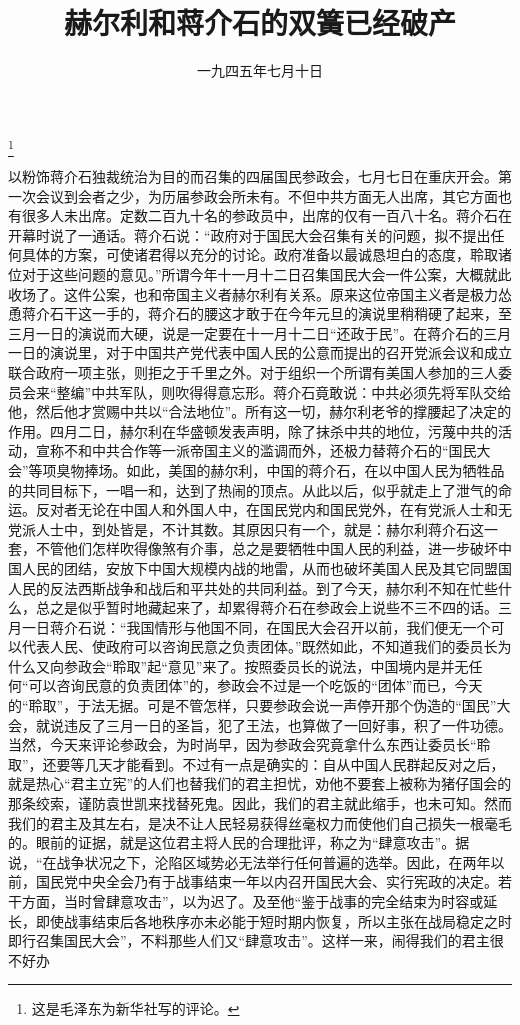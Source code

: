 
\title{赫尔利和蒋介石的双簧已经破产}
\date{一九四五年七月十日}
\thanks{这是毛泽东为新华社写的评论。}
\maketitle


以粉饰蒋介石独裁统治为目的而召集的四届国民参政会，七月七日在重庆开会。第一次会议到会者之少，为历届参政会所未有。不但中共方面无人出席，其它方面也有很多人未出席。定数二百九十名的参政员中，出席的仅有一百八十名。蒋介石在开幕时说了一通话。蒋介石说：“政府对于国民大会召集有关的问题，拟不提出任何具体的方案，可使诸君得以充分的讨论。政府准备以最诚恳坦白的态度，聆取诸位对于这些问题的意见。”所谓今年十一月十二日召集国民大会一件公案，大概就此收场了。这件公案，也和帝国主义者赫尔利有关系。原来这位帝国主义者是极力怂恿蒋介石干这一手的，蒋介石的腰这才敢于在今年元旦的演说里稍稍硬了起来，至三月一日的演说而大硬，说是一定要在十一月十二日“还政于民”。在蒋介石的三月一日的演说里，对于中国共产党代表中国人民的公意而提出的召开党派会议和成立联合政府一项主张，则拒之于千里之外。对于组织一个所谓有美国人参加的三人委员会来“整编”中共军队，则吹得得意忘形。蒋介石竟敢说：中共必须先将军队交给他，然后他才赏赐中共以“合法地位”。所有这一切，赫尔利老爷的撑腰起了决定的作用。四月二日，赫尔利在华盛顿发表声明，除了抹杀中共的地位，污蔑中共的活动，宣称不和中共合作等一派帝国主义的滥调而外，还极力替蒋介石的“国民大会”等项臭物捧场。如此，美国的赫尔利，中国的蒋介石，在以中国人民为牺牲品的共同目标下，一唱一和，达到了热闹的顶点。从此以后，似乎就走上了泄气的命运。反对者无论在中国人和外国人中，在国民党内和国民党外，在有党派人士和无党派人士中，到处皆是，不计其数。其原因只有一个，就是：赫尔利蒋介石这一套，不管他们怎样吹得像煞有介事，总之是要牺牲中国人民的利益，进一步破坏中国人民的团结，安放下中国大规模内战的地雷，从而也破坏美国人民及其它同盟国人民的反法西斯战争和战后和平共处的共同利益。到了今天，赫尔利不知在忙些什么，总之是似乎暂时地藏起来了，却累得蒋介石在参政会上说些不三不四的话。三月一日蒋介石说：“我国情形与他国不同，在国民大会召开以前，我们便无一个可以代表人民、使政府可以咨询民意之负责团体。”既然如此，不知道我们的委员长为什么又向参政会“聆取”起“意见”来了。按照委员长的说法，中国境内是并无任何“可以咨询民意的负责团体”的，参政会不过是一个吃饭的“团体”而已，今天的“聆取”，于法无据。可是不管怎样，只要参政会说一声停开那个伪造的“国民”大会，就说违反了三月一日的圣旨，犯了王法，也算做了一回好事，积了一件功德。当然，今天来评论参政会，为时尚早，因为参政会究竟拿什么东西让委员长“聆取”，还要等几天才能看到。不过有一点是确实的：自从中国人民群起反对之后，就是热心“君主立宪”的人们也替我们的君主担忧，劝他不要套上被称为猪仔国会的那条绞索，谨防袁世凯来找替死鬼。因此，我们的君主就此缩手，也未可知。然而我们的君主及其左右，是决不让人民轻易获得丝毫权力而使他们自己损失一根毫毛的。眼前的证据，就是这位君主将人民的合理批评，称之为“肆意攻击”。据说，“在战争状况之下，沦陷区域势必无法举行任何普遍的选举。因此，在两年以前，国民党中央全会乃有于战事结束一年以内召开国民大会、实行宪政的决定。若干方面，当时曾肆意攻击”，以为迟了。及至他“鉴于战事的完全结束为时容或延长，即使战事结束后各地秩序亦未必能于短时期内恢复，所以主张在战局稳定之时即行召集国民大会”，不料那些人们又“肆意攻击”。这样一来，闹得我们的君主很不好办